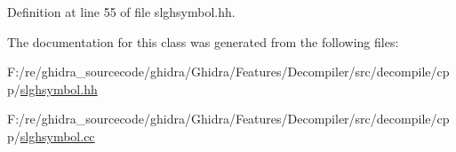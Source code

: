 Definition at line 55 of file slghsymbol.\+hh.



The documentation for this class was generated from the following files\+:\begin{DoxyCompactItemize}
\item 
F\+:/re/ghidra\+\_\+sourcecode/ghidra/\+Ghidra/\+Features/\+Decompiler/src/decompile/cpp/\mbox{\hyperlink{slghsymbol_8hh}{slghsymbol.\+hh}}\item 
F\+:/re/ghidra\+\_\+sourcecode/ghidra/\+Ghidra/\+Features/\+Decompiler/src/decompile/cpp/\mbox{\hyperlink{slghsymbol_8cc}{slghsymbol.\+cc}}\end{DoxyCompactItemize}
